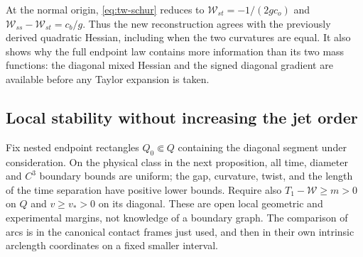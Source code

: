 At the normal origin, \eqref{eq:tw-schur} reduces to
$\mathcal W_{st}=-1/(2gc_o)$ and
$\mathcal W_{ss}-\mathcal W_{st}=c_b/g$. Thus the new reconstruction
agrees with the previously derived quadratic Hessian, including when
the two curvatures are equal. It also shows why the full endpoint law
contains more information than its two mass functions: the diagonal
mixed Hessian and the signed diagonal gradient are available before
any Taylor expansion is taken.

\subsection{Local stability without increasing the jet order}
Fix nested endpoint rectangles $Q_0\Subset Q$ containing the diagonal
segment under consideration. On the physical class in the next
proposition, all time, diameter and $C^3$ boundary bounds are uniform;
the gap, curvature, twist, and the length of the time separation have
positive lower bounds. Require also $T_1-\mathcal W\ge m>0$ on $Q$
and $v\ge v_*>0$ on its diagonal. These are open local geometric and
experimental margins, not knowledge of a boundary graph. The comparison
of arcs is in the canonical contact frames just used, and then in their
own intrinsic arclength coordinates on a fixed smaller interval.

